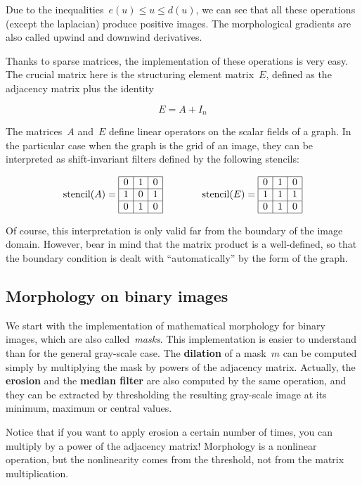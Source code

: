 Due to the inequalities~$e(u)\le u\le d(u)$, we can see that all these
operations (except the laplacian) produce positive images.  The morphological
gradients are also called upwind and downwind derivatives.

Thanks to sparse matrices, the implementation of these operations is very
easy.  The crucial matrix here is the structuring element matrix~$E$, defined
as the adjacency matrix plus the identity

$$
E = A + I_n
$$

The matrices~$A$ and~$E$ define linear operators on the scalar fields of a
graph.  In the particular case when the graph is the grid of an image, they
can be interpreted as shift-invariant filters defined by the following
stencils:

$$
\mathrm{stencil}(A)=
\begin{array}{|c|c|c|}\hline0&1&0\\\hline1&0&1\\\hline0&1&0\\\hline\end{array}
	\qquad
	\qquad
\mathrm{stencil}(E)=
\begin{array}{|c|c|c|}\hline0&1&0\\\hline1&1&1\\\hline0&1&0\\\hline\end{array}
$$

Of course, this interpretation is only valid far from the boundary of the
image domain.  However, bear in mind that the matrix product is a well-defined,
so that the boundary condition is dealt with ``automatically'' by the form of
the graph.

\subsection{Morphology on binary images}


We start with the implementation of mathematical morphology for binary
images, which are also called~\emph{masks}.
This implementation is easier to understand than for the
general gray-scale case.
The {\bf dilation} of a mask~$m$ can be computed simply by multiplying the
mask by powers of the adjacency matrix.  Actually, the {\bf erosion} and the
{\bf median filter} are also computed by the same operation, and they can be
extracted by thresholding the resulting gray-scale image at its minimum,
maximum or central values.

Notice that if you want to apply erosion a certain number of times, you can
multiply by a power of the adjacency matrix!  Morphology is a nonlinear
operation, but the nonlinearity comes from the threshold, not from the
matrix multiplication.

